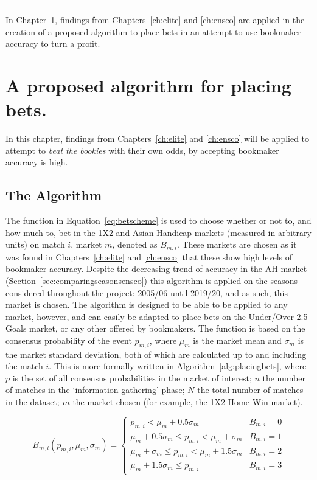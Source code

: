\documentclass[a4paper,10pt]{report}
\begin{document}
\begin{center}\noindent\rule{0.5\textwidth}{0.6pt}\end{center}

In Chapter~\ref{ch:model}, findings from Chapters~\ref{ch:elite} and \ref{ch:ensco} are applied in the creation of a proposed algorithm to place bets in an attempt to use bookmaker accuracy to turn a profit.


\chapter[A Proposed Betting Algorithm]{A proposed algorithm for placing bets.}\label{ch:model}

In this chapter, findings from Chapters~\ref{ch:elite} and \ref{ch:ensco} will be applied to attempt to \textit{beat the bookies} with their own odds, by accepting bookmaker accuracy is high.

\section{The Algorithm}\label{sec:method}

The function in Equation~\ref{eq:betscheme} is used to choose whether or not to, and how much to, bet in the 1X2 and Asian Handicap markets (measured in arbitrary units) on match $i$, market $m$, denoted as $B_{m,i}$. These markets are chosen as it was found in Chapters~\ref{ch:elite} and \ref{ch:ensco} that these show high levels of bookmaker accuracy. Despite the decreasing trend of accuracy in the AH market (Section~\ref{sec:comparingseasonsensco}) this algorithm is applied on the seasons considered throughout the project: 2005/06 until 2019/20, and as such, this market is chosen. The algorithm is designed to be able to be applied to any market, however, and can easily be adapted to place bets on the Under/Over 2.5 Goals market, or any other offered by bookmakers. The function is based on the consensus probability of the event $p_{m,i}$, where $\mu_m$ is the market mean and $\sigma_m$ is the market standard deviation, both of which are calculated up to and including the match $i$. This is more formally written in Algorithm~\ref{alg:placingbets}, where $p$ is the set of all consensus probabilities in the market of interest; $n$ the number of matches in the `information gathering' phase; $N$ the total number of matches in the dataset; $m$ the market chosen (for example, the 1X2 Home Win market).

\begin{equation}\label{eq:betscheme}
B_{m,i}(p_{m,i}, \mu_m, \sigma_m) = 
\begin{cases}
p_{m,i} < \mu_m + 0.5\sigma_m & B_{m,i} = 0 \\
\mu_m + 0.5\sigma_{m} \le p_{m,i} < \mu_m + \sigma_m & B_{m,i} = 1\\
\mu_m + \sigma_{m} \le p_{m,i} < \mu_m + 1.5\sigma_m & B_{m,i} = 2\\
\mu_m + 1.5\sigma_{m} \le p_{m,i}  & B_{m,i} = 3
\end{cases}
\end{equation}
\end{document}

